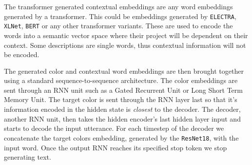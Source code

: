 \par
The transformer generated contextual embeddings are any word embeddings generated by a transformer. This could be embeddings generated by \texttt{ELECTRA}, \texttt{XLNet}, \texttt{BERT} or any other transformer variants. These are used to encode the words into a semantic vector space where their project will be dependent on their context. Some descriptions are single words, thus contextual information will not be encoded.

\par
The generated color and contextual word embeddings are then brought together using a standard sequence-to-sequence architecture. The color embeddings are sent through an RNN unit such as a Gated Recurrent Unit or Long Short Term Memory Unit. The target color is sent through the RNN layer last so that it’s information encoded in the hidden state is \emph{closest} to the decoder. The decoder, another RNN unit,  then takes the hidden encoder's last hidden layer input and starts to decode the input utterance. For each timestep of the decoder we concatenate the target colors embedding, generated by the \texttt{ResNet18}, with the input word. Once the output RNN reaches its specified stop token we stop generating text.